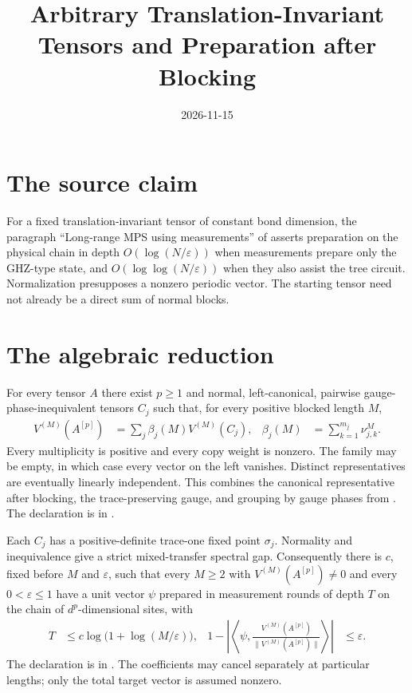 \documentclass{article}
\title{Arbitrary Translation-Invariant Tensors and Preparation after Blocking}
\author{}
\date{2026-11-15}
\begin{document}
\maketitle
{}

\section{The source claim}
For a fixed translation-invariant tensor of constant bond dimension,
the paragraph ``Long-range MPS using measurements'' of
\cite{Malz2024Preparation} asserts preparation on the physical chain in
depth $O(\log(N/\varepsilon))$ when measurements prepare only the
GHZ-type state, and $O(\log\log(N/\varepsilon))$ when they also assist
the tree circuit. Normalization presupposes a nonzero periodic vector.
The starting tensor need not already be a direct sum of normal blocks.

\section{The algebraic reduction}
For every tensor $A$ there exist $p\ge1$ and normal, left-canonical,
pairwise gauge-phase-inequivalent tensors $C_j$ such that, for every
positive blocked length $M$,
\begin{align*}
    V^{(M)}(A^{[p]})
     &=\sum_j\beta_j(M)V^{(M)}(C_j), &
    \beta_j(M)&=\sum_{k=1}^{m_j}\nu_{j,k}^{M}.
\end{align*}
Every multiplicity is positive and every copy weight is nonzero.
The family may be empty, in which case every vector on the left vanishes.
Distinct representatives are eventually linearly independent.
This combines the canonical representative after blocking, the
trace-preserving gauge, and grouping by gauge phases from
\cite[Section~2.3 and Appendix~A]{Cirac2016MPDO_arXiv}.
The declaration is
in .

Each $C_j$ has a positive-definite trace-one fixed point $\sigma_j$.
Normality and inequivalence give a strict mixed-transfer spectral gap.
Consequently there is $c$, fixed before $M$ and $\varepsilon$, such that
every $M\ge2$ with $V^{(M)}(A^{[p]})\ne0$ and every
$0<\varepsilon\le1$ have a unit vector $\psi$ prepared in measurement
rounds of depth $T$ on the chain of $d^p$-dimensional sites, with
\begin{align*}
    T&\le c\log\bigl(1+\log(M/\varepsilon)\bigr), &
    1-\left|\left\langle\psi,
    \frac{V^{(M)}(A^{[p]})}{\|V^{(M)}(A^{[p]})\|}\right\rangle\right|
    &\le\varepsilon.
\end{align*}
The declaration is
in .
The coefficients may cancel separately at particular lengths; only the
total target vector is assumed nonzero.
\end{document}

